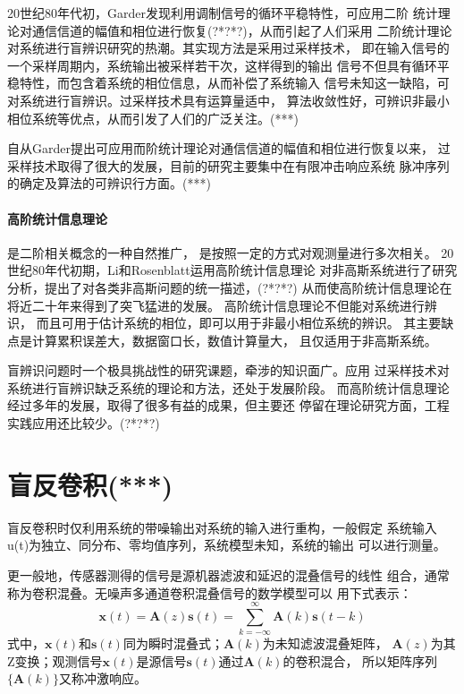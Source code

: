 20世纪80年代初，Garder发现利用调制信号的循环平稳特性，可应用二阶
统计理论对通信信道的幅值和相位进行恢复(?*?*?)，从而引起了人们采用
二阶统计理论对系统进行盲辨识研究的热潮。其实现方法是采用过采样技术，
即在输入信号的一个采样周期内，系统输出被采样若干次，这样得到的输出
信号不但具有循环平稳特性，而包含着系统的相位信息，从而补偿了系统输入
信号未知这一缺陷，可对系统进行盲辨识。过采样技术具有运算量适中，
算法收敛性好，可辨识非最小相位系统等优点，从而引发了人们的广泛关注。(***)

自从Garder提出可应用而阶统计理论对通信信道的幅值和相位进行恢复以来，
过采样技术取得了很大的发展，目前的研究主要集中在有限冲击响应系统
脉冲序列的确定及算法的可辨识行方面。(***)

\paragraph*{高阶统计信息理论}是二阶相关概念的一种自然推广，
是按照一定的方式对观测量进行多次相关。
20世纪80年代初期，Li和Rosenblatt运用高阶统计信息理论
对非高斯系统进行了研究分析，提出了对各类非高斯问题的统一描述，(?*?*?) 
从而使高阶统计信息理论在将近二十年来得到了突飞猛进的发展。
高阶统计信息理论不但能对系统进行辨识，
而且可用于估计系统的相位，即可以用于非最小相位系统的辨识。
其主要缺点是计算累积误差大，数据窗口长，数值计算量大，
且仅适用于非高斯系统。

盲辨识问题时一个极具挑战性的研究课题，牵涉的知识面广。应用
过采样技术对系统进行盲辨识缺乏系统的理论和方法，还处于发展阶段。
而高阶统计信息理论经过多年的发展，取得了很多有益的成果，但主要还
停留在理论研究方面，工程实践应用还比较少。(?*?*?)

\section{盲反卷积(***)}
盲反卷积时仅利用系统的带噪输出对系统的输入进行重构，一般假定
系统输入u(t)为独立、同分布、零均值序列，系统模型未知，系统的输出
可以进行测量。

    更一般地，传感器测得的信号是源机器滤波和延迟的混叠信号的线性
组合，通常称为卷积混叠。无噪声多通道卷积混叠信号的数学模型可以
用下式表示：
\begin{equation} 
\bm{x}(t)=\bm{A}(z)\bm{s}(t) = 
\sum^\infty_{k=-\infty}\bm{A}(k)\bm{s}(t-k)
\end{equation}
式中，$\bm{x}(t)$和$\bm{s}(t)$同为瞬时混叠式；$\bm{A}(k)$为未知滤波混叠矩阵，
$\bm{A}(z)$为其Z变换；观测信号$\bm{x}(t)$是源信号$\bm{s}(t)$通过$\bm{A}(k)$的卷积混合，
所以矩阵序列$\{\bm{A}(k)\}$又称冲激响应。
    

